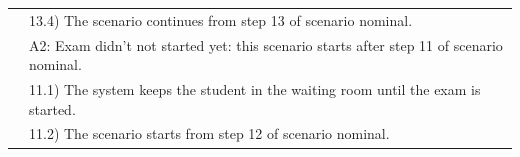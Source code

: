\documentclass[]{uc2pfecaneva}
\begin{document}
\begin{table}[h]
\begin{tabularx}{\textwidth}{|l|X|}
            & \hspace{4mm}13.4) The scenario continues from step 13 of scenario nominal.                        \\
            & A2: Exam didn't not started yet: this scenario starts after step 11 of scenario nominal.          \\
            & \hspace{4mm}11.1) The system keeps the student in the waiting room until the exam is started.     \\
            & \hspace{4mm}11.2) The scenario starts from step 12 of scenario nominal.                           \\ \hline
        \end{tabularx}
        \label{table:4}
    \end{table}
    \clearpage
\end{document}
